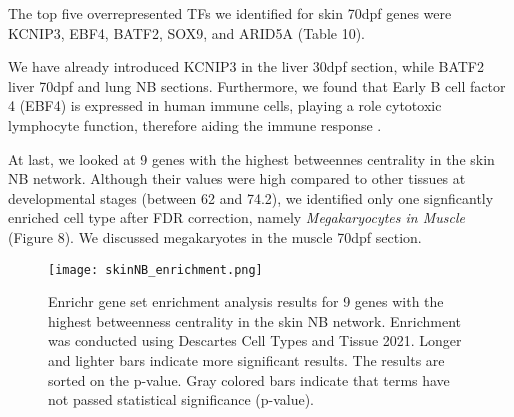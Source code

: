 \documentclass[
	a4paper, %
	10pt, %
	unnumberedsections, %
	twoside, %
]{LTJournalArticle}
\begin{document}
\noindent The top five overrepresented TFs we identified for skin 70dpf genes were
KCNIP3, EBF4, BATF2, SOX9, and ARID5A (Table 10).

\begin{table}[H]
	\caption{Transcription Factor Target Over-representation Analysis results for 10 genes with the highest betweenness centrality in the skin 70dpf network from the ChEA3 web tool.}
	\label{tab:skin70_tf}
	\end{table}

\noindent We have already introduced KCNIP3 in the liver 30dpf section, 
while BATF2 liver 70dpf and lung NB sections.
Furthermore, we found that Early B cell factor 4 (EBF4) is expressed in human immune
cells, playing a role cytotoxic lymphocyte function,
therefore aiding the immune response \autocite{kubo2022a}.

At last, we looked at 9 genes with the highest betweennes centrality
in the skin NB network. Although their values were high compared to 
other tissues at developmental stages (between 62 and 74.2), we identified
only one signficantly enriched cell type after FDR correction, namely
\textit{Megakaryocytes in Muscle} (Figure 8). We discussed
megakaryotes in the muscle 70dpf section.

\begin{figure}[H] %
	\texttt{[image: skinNB\_enrichment.png]}
	\caption{Enrichr gene set enrichment analysis results for 9 genes
	with the highest betweenness centrality in the skin NB network. Enrichment 
	was conducted using Descartes Cell Types and Tissue 2021. Longer and lighter
	bars indicate more significant results. The results are sorted on
	the p-value. Gray colored bars indicate that terms have 
	not passed statistical significance (p-value).}
	\label{fig:skinNBenr}
\end{figure}
\end{document}
